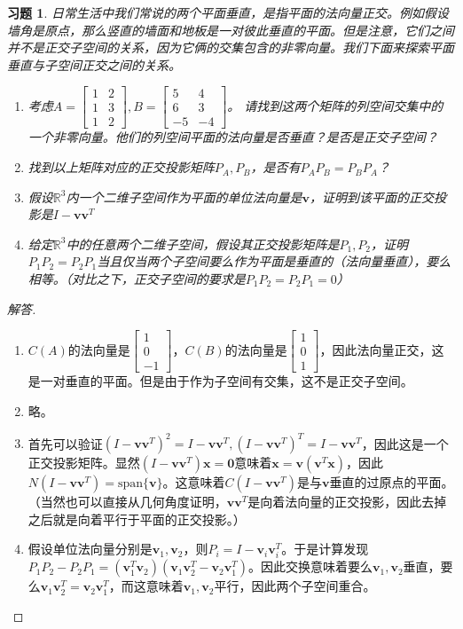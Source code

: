 \documentclass[UTF8]{ctexart}
\newcommand{\Ker}{N}
\newtheorem{ex}[thm]{习题}
\begin{document}
\begin{ex}
日常生活中我们常说的两个平面垂直，是指平面的法向量正交。例如假设墙角是原点，那么竖直的墙面和地板是一对彼此垂直的平面。但是注意，它们之间并不是正交子空间的关系，因为它俩的交集包含的非零向量。我们下面来探索平面垂直与子空间正交之间的关系。
\begin{enumerate}
\item 考虑$A=\begin{bmatrix}1&2\\1&3\\1&2\end{bmatrix},B=\begin{bmatrix}5&4\\6&3\\-5&-4\end{bmatrix}$。 请找到这两个矩阵的列空间交集中的一个非零向量。他们的列空间平面的法向量是否垂直？是否是正交子空间？
\item 找到以上矩阵对应的正交投影矩阵$P_A,P_B$，是否有$P_AP_B=P_BP_A$？
\item 假设$\mathbb{R}^3$内一个二维子空间作为平面的单位法向量是$\bm v$，证明到该平面的正交投影是$I-\bm v\bm v^T$
\item 给定$\mathbb{R}^3$中的任意两个二维子空间，假设其正交投影矩阵是$P_1,P_2$，证明$P_1P_2=P_2P_1$当且仅当两个子空间要么作为平面是垂直的（法向量垂直），要么相等。（对比之下，正交子空间的要求是$P_1P_2=P_2P_1=0$）
\end{enumerate}
\end{ex}

\begin{proof}[解答]
\begin{enumerate}
\item $C(A)$的法向量是$\begin{bmatrix}1\\0\\-1\end{bmatrix}$，$C(B)$的法向量是$\begin{bmatrix}1\\0\\1\end{bmatrix}$，因此法向量正交，这是一对垂直的平面。但是由于作为子空间有交集，这不是正交子空间。
\item 略。
\item 首先可以验证$(I-\bm v\bm v^T)^2=I-\bm v\bm v^T,(I-\bm v\bm v^T)^T=I-\bm v\bm v^T$，因此这是一个正交投影矩阵。显然$(I-\bm v\bm v^T)\bm x=\bm 0$意味着$\bm x=\bm v(\bm v^T\bm x)$，因此$\Ker(I-\bm v\bm v^T)=\mathrm{span}\{\bm v\}$。这意味着$C(I-\bm v\bm v^T)$是与$\bm v$垂直的过原点的平面。（当然也可以直接从几何角度证明，$\bm v\bm v^T$是向着法向量的正交投影，因此去掉之后就是向着平行于平面的正交投影。）
\item 假设单位法向量分别是$\bm v_1,\bm v_2$，则$P_i=I-\bm v_i\bm v_i^T$。于是计算发现$P_1P_2-P_2P_1=(\bm v_1^T\bm v_2)(\bm v_1\bm v_2^T-\bm v_2\bm v_1^T)$。因此交换意味着要么$\bm v_1,\bm v_2$垂直，要么$\bm v_1\bm v_2^T=\bm v_2\bm v_1^T$，而这意味着$\bm v_1,\bm v_2$平行，因此两个子空间重合。
\end{enumerate}
\end{proof}
\end{document}
